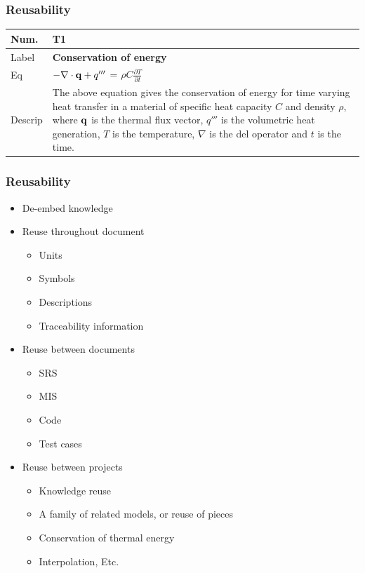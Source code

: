 \documentclass[t,12pt,numbers,fleqn]{beamer}
\newcommand{\colAwidth}{0.1\textwidth}
\newcommand{\colBwidth}{0.8\textwidth}
\begin{document}

\begin{frame}

\frametitle{Reusability}

\noindent
\begin{minipage}{\columnwidth}
\begin{tabular}{@{} p{\colAwidth}  p{\colBwidth}@{}}
\toprule
\textbf{Num.}& \textbf{T1} \\
\midrule
Label &\bf Conservation of energy\\
\midrule
Eq &  $-{\bf \nabla \cdot q} +q'''$ = $\rho C \frac{\partial T}{\partial t}$ \smallskip\\
\midrule
Descrip & The above equation gives the conservation of energy for time 
varying heat transfer in a material of specific heat capacity $C$ and density $\rho$,
where $\bf q$ is the thermal flux vector, $q'''$ is the volumetric heat
generation, $T$ is the temperature, $\nabla$ is the del operator and $t$ is the time.\\
\bottomrule
\end{tabular}
\end{minipage}

\end{frame}


\begin{frame}

\frametitle{Reusability}

\begin{itemize}
\item De-embed knowledge
\item Reuse throughout document
\begin{itemize}
\item Units
\item Symbols
\item Descriptions
\item Traceability information
\end{itemize}
\item Reuse between documents
\begin{itemize}
\item SRS
\item MIS
\item Code
\item Test cases
\end{itemize}
\item Reuse between projects
\begin{itemize}
\item Knowledge reuse
\item A family of related models, or reuse of pieces
\item Conservation of thermal energy
\item Interpolation, Etc.
\end{itemize}
\end{itemize}
\end{frame}
\end{document}
